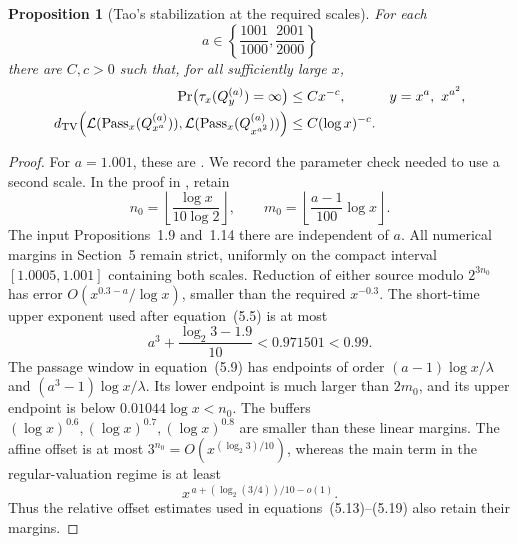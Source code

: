\documentclass[11pt,a4paper]{article}
\newtheorem{proposition}[theorem]{Proposition}
\begin{document}
\begin{proposition}[Tao's stabilization at the required scales]
\label{prop:ct-tao-input}
For each
\[
 a\in\left\{\frac{1001}{1000},\frac{2001}{2000}\right\}
\]
there are \(C,c>0\) such that, for all sufficiently large \(x\),
\begin{align}
 \Pr\bigl(\tau_x(Q_y^{(a)})=\infty\bigr)&\le Cx^{-c},
       &&y=x^a,\ x^{a^2},\label{eq:ct-tao-failure}\\
 d_{\rm TV}\!\left(
 \mathcal L(\operatorname{Pass}_x(Q_{x^a}^{(a)})),
 \mathcal L(\operatorname{Pass}_x(Q_{x^{a^2}}^{(a)}))
 \right)&\le C(\log x)^{-c}.\label{eq:ct-tao-tv}
\end{align}
\end{proposition}
\begin{proof}
For \(a=1.001\), these are
\cite[Proposition~1.11, equations~(1.19)--(1.20)]{Tao2022}.
We record the parameter check needed to use a second scale.
In the proof in \cite[Section~5]{Tao2022}, retain
\[
 n_0=\left\lfloor\frac{\log x}{10\log2}\right\rfloor,
 \qquad
 m_0=\left\lfloor\frac{a-1}{100}\log x\right\rfloor.
\]
The input Propositions~1.9 and~1.14 there are independent of \(a\).
All numerical margins in Section~5 remain strict, uniformly on the
compact interval \([1.0005,1.001]\) containing both scales.
Reduction of either source modulo
\(2^{3n_0}\) has error
\(O(x^{0.3-a}/\log x)\), smaller than the required \(x^{-0.3}\).
The short-time upper exponent used after equation~(5.5) is at most
\[
 a^3+\frac{\log_2 3-1.9}{10}<0.971501<0.99.
\]
The passage window in equation~(5.9) has endpoints of order
\((a-1)\log x/\lambda\) and
\((a^3-1)\log x/\lambda\). Its lower endpoint is much larger
than \(2m_0\), and its upper endpoint is below
\(0.01044\log x<n_0\). The buffers
\((\log x)^{0.6},(\log x)^{0.7},(\log x)^{0.8}\) are smaller
than these linear margins. The affine offset is at most
\(3^{n_0}=O(x^{(\log_2 3)/10})\), whereas the main term in the
regular-valuation regime is at least
\[
 x^{\,a+(\log_2(3/4))/10-o(1)}.
\]
Thus the relative offset estimates used in equations~(5.13)--(5.19)
also retain their margins.


\end{proof}
\end{document}
